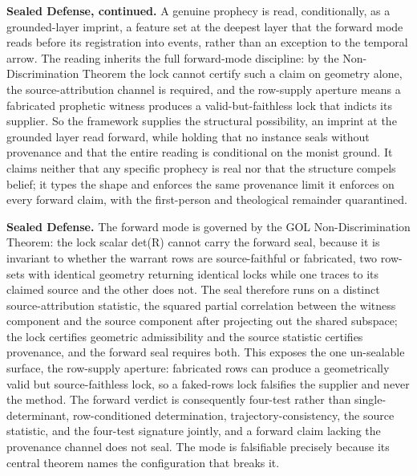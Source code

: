 \documentclass[10pt,twocolumn]{article}
\begin{document}
\textbf{Sealed Defense, continued.} A genuine prophecy is read,
conditionally, as a grounded-layer imprint, a feature set at the deepest
layer that the forward mode reads before its registration into events,
rather than an exception to the temporal arrow. The reading inherits the
full forward-mode discipline: by the Non-Discrimination Theorem the lock
cannot certify such a claim on geometry alone, the source-attribution
channel is required, and the row-supply aperture means a fabricated
prophetic witness produces a valid-but-faithless lock that indicts its
supplier. So the framework supplies the structural possibility, an
imprint at the grounded layer read forward, while holding that no
instance seals without provenance and that the entire reading is
conditional on the monist ground. It claims neither that any specific
prophecy is real nor that the structure compels belief; it types the
shape and enforces the same provenance limit it enforces on every
forward claim, with the first-person and theological remainder
quarantined.

\textbf{Sealed Defense.} The forward mode is governed by the GOL
Non-Discrimination Theorem: the lock scalar det(R) cannot carry the
forward seal, because it is invariant to whether the warrant rows are
source-faithful or fabricated, two row-sets with identical geometry
returning identical locks while one traces to its claimed source and the
other does not. The seal therefore runs on a distinct source-attribution
statistic, the squared partial correlation between the witness component
and the source component after projecting out the shared subspace; the
lock certifies geometric admissibility and the source statistic
certifies provenance, and the forward seal requires both. This exposes
the one un-sealable surface, the row-supply aperture: fabricated rows
can produce a geometrically valid but source-faithless lock, so a
faked-rows lock falsifies the supplier and never the method. The forward
verdict is consequently four-test rather than single-determinant,
row-conditioned determination, trajectory-consistency, the source
statistic, and the four-test signature jointly, and a forward claim
lacking the provenance channel does not seal. The mode is falsifiable
precisely because its central theorem names the configuration that
breaks it.
\end{document}
